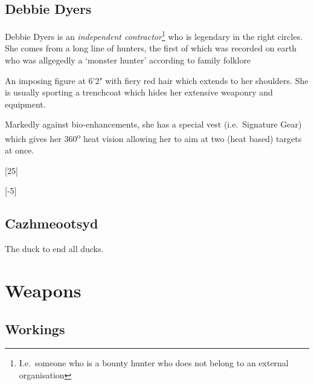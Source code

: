 \section{Debbie Dyers}
\label{sec:debbie-dyers}

Debbie Dyers is an \emph{independent contractor}\footnote{I.e.~someone who is a
  bounty hunter who does not belong to an external organisation} who is
legendary in the right circles. She comes from a long line of hunters, the first
of which was recorded on earth who was allgegedly a `monster hunter' according
to family folklore

An imposing figure at 6'2" with fiery red hair which extends to her shoulders.
She is usually sporting a trenchcoat which hides her extensive weaponry and
equipment.

Markedly against bio-enhancements, she has a special vest (i.e.~Signature Gear)
which gives her 360\textsuperscript{o} heat vision allowing her to aim at
two (heat based) targets at once.

\begin{character}
     

  [25]

  [-5]

\end{character}


\section{Cazhmeootsyd}
\label{sec:cazhmeootsyd}

The duck to end all ducks.

\begin{character}
\end{character}

\chapter{Weapons}
\label{cha:weapons}

\section{Workings}
\label{sec:workings}




